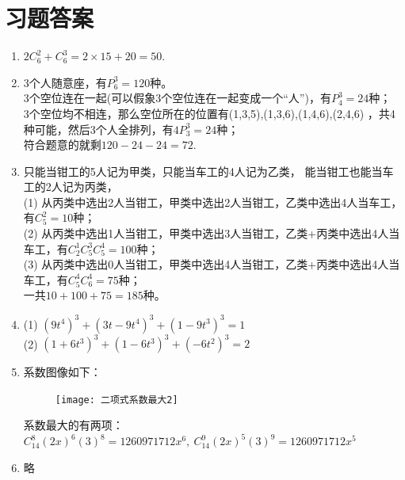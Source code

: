 \section{习题答案}
\begin{enumerate}[label={\textbf{\arabic*.}},leftmargin=
    \inteval{\myenumleftmargin}pt]
\item $ 2C_6^2+C_6^3=2\times 15+20=50 $.

\item 3个人随意座，有$ P_6^3=120 $种。\\
3个空位连在一起(可以假象3个空位连在一起变成一个“人”)，有$P_4^3=24$种；\\
3个空位均不相连，那么空位所在的位置有(1,3,5),(1,3,6),(1,4,6),(2,4,6)
，共4种可能，然后3个人全排列，有$4P_3^3=24$种；\\
符合题意的就剩$ 120-24-24=72$.

\item 只能当钳工的5人记为甲类，只能当车工的4人记为乙类，
能当钳工也能当车工的2人记为丙类，\\
(1) 从丙类中选出2人当钳工，甲类中选出2人当钳工，乙类中选出4人当车工，有$ C_5^2=10 $种；\\
(2) 从丙类中选出1人当钳工，甲类中选出3人当钳工，乙类+丙类中选出4人当车工，有$ C_2^1C_5^3C_5^4=100 $种；\\
(3) 从丙类中选出0人当钳工，甲类中选出4人当钳工，乙类+丙类中选出4人当车工，有$ C_5^4C_6^4=75 $种；\\
一共$10+100+75=185$种。

\item (1) $ \left(9t^4\right)^3+\left(3t-9t^4\right)^3+
\left(1-9t^3\right)^3=1 $ \\
(2) $ \left(1+6t^3\right)^3+\left(1-6t^3\right)^3+
\left(-6t^2\right)^3=2 $

\item 系数图像如下：
\begin{figure}[H]
    \centering
    \texttt{[image: 二项式系数最大2]}
\end{figure}
系数最大的有两项：$ C_{14}^{8}(2x)^6(3)^8=1260971712x^{6},\ 
C_{14}^{9}(2x)^5(3)^9=1260971712x^{5} $

\item 略


\end{enumerate}
